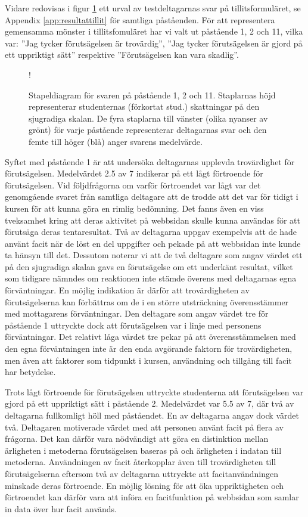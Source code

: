 Vidare redovisas i figur \ref{fig:raket9} ett urval av testdeltagarnas svar på tillitsformuläret, se Appendix \ref{app:resultattillit} för samtliga påståenden. För att representera gemensamma mönster i tillitsfomuläret har vi valt ut påstående 1, 2 och 11, vilka var: ''Jag tycker förutsägelsen är trovärdig'', ''Jag tycker förutsägelsen är gjord på ett uppriktigt sätt'' respektive ''Förutsägelsen kan vara skadlig''.
\begin{figure}[hbtp]
    \centering
    \hspace{-35px}
    \resizebox {\textwidth} {!} {
        
    }
    \caption{Stapeldiagram för svaren på påstående 1, 2 och 11. Staplarnas höjd representerar studenternas (förkortat stud.) skattningar på den sjugradiga skalan. De fyra staplarna till vänster (olika nyanser av grönt) för varje påstående representerar deltagarnas svar och den femte till höger (blå) anger svarens medelvärde.}
    \label{fig:raket9}
\end{figure}
Syftet med påstående 1 är att undersöka deltagarnas upplevda trovärdighet för förutsägelsen. Medelvärdet 2.5 av 7 indikerar på ett lågt förtroende för förutsägelsen. Vid följdfrågorna om varför förtroendet var lågt var det genomgående svaret från samtliga deltagare att de trodde att det var för tidigt i kursen för att kunna göra en rimlig bedömning. Det fanns även en viss tveksamhet kring att deras aktivitet på webbsidan skulle kunna användas för att förutsäga deras tentaresultat. Två av deltagarna uppgav exempelvis att de hade använt facit när de löst en del uppgifter och pekade på att webbsidan inte kunde ta hänsyn till det. Dessutom noterar vi att de två deltagare som angav värdet ett på den sjugradiga skalan gavs en förutsägelse om ett underkänt resultat, vilket som tidigare nämndes om reaktionen inte stämde överens med deltagarnas egna förväntningar. En möjlig indikation är därför att trovärdigheten av förutsägelserna kan förbättras om de i en större utsträckning överensstämmer med mottagarens förväntningar. Den deltagare som angav värdet tre för påstående 1 uttryckte dock att förutsägelsen var i linje med personens förväntningar. Det relativt låga värdet tre pekar på att överensstämmelsen med den egna förväntningen inte är den enda avgörande faktorn för trovärdigheten, men även att faktorer som tidpunkt i kursen, användning och tillgång till facit har betydelse.
 
Trots lågt förtroende för förutsägelsen uttryckte studenterna att förutsägelsen var gjord på ett uppriktigt sätt i påstående 2. Medelvärdet var 5.5 av 7, där två av deltagarna fullkomligt höll med påståendet. En av deltagarna angav dock värdet två. Deltagaren motiverade värdet med att personen använt facit på flera av frågorna. Det kan därför vara nödvändigt att göra en distinktion mellan ärligheten i metoderna förutsägelsen baseras på och ärligheten i indatan till metoderna. Användningen av facit återkopplar även till trovärdigheten till förutsägelserna eftersom två av deltagarna uttryckte att facitanvändningen minskade deras förtroende. En möjlig lösning för att öka uppriktigheten och förtroendet kan därför vara att införa en facitfunktion på webbsidan som samlar in data över hur facit används.


